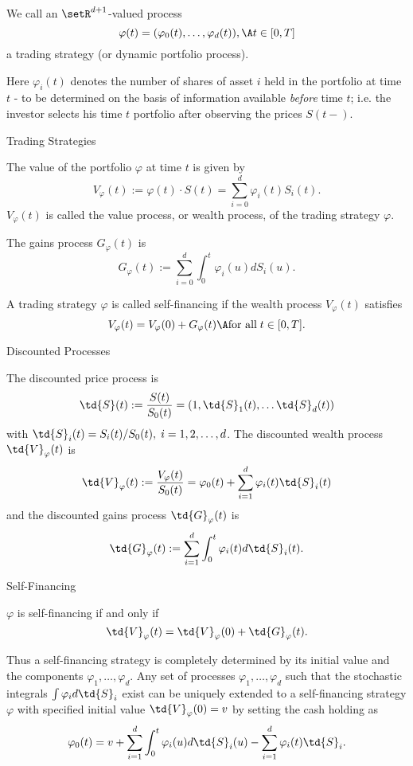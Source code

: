


	We call an $\setR^{d+1}$-valued process
$$
\varphi(t) = (\varphi_0(t), \ldots, \varphi_d(t)), \A t \in [0,T]
$$
a trading strategy (or dynamic portfolio process).

Here $\varphi_i(t)$ denotes the number of shares of asset $i$ held
in the portfolio at time $t$ - to be determined on the basis of
information available {\it before} time $t$; i.e. the investor
selects his time $t$ portfolio after observing the prices $S(t-)$.






{ Trading Strategies}






	The value of the portfolio $\varphi$ at time $t$ is
given by
$$
V_\varphi(t) :=  \varphi(t) \cdot S(t) = \sum_{i=0}^d \varphi_i(t)
S_i(t).
$$
$V_\varphi(t)$ is called the value process, or wealth process, of
the trading strategy $\varphi$.\

	 The gains process
$G_\varphi(t)$ is
$$
G_\varphi(t) := \sum_{i=0}^d \int_0^t \varphi_i(u) dS_i(u).
$$

	A trading strategy $\varphi$ is called self-financing if
the wealth process $V_\varphi(t)$ satisfies
$$
V_\varphi(t) = V_\varphi(0) + G_\varphi(t)\A \mbox{for all}\; t\in
[0,T].
$$






{ Discounted Processes}

The discounted price process is
$$
\td{S}(t) := \frac{S(t)}{S_0(t)} = (1, \td{S}_1(t), \ldots
\td{S}_d(t))
$$
with $\td{S}_i(t) = S_i(t)/S_0(t),\; i=1,2, \ldots, d$. The
discounted wealth process $\td{V}_\varphi(t)$ is
$$
\td{V}_\varphi(t):= \frac{V_\varphi(t)}{S_0(t)} = \varphi_0(t) +
\sum_{i=1}^d \varphi_i(t) \td{S}_i(t)
$$
and the discounted gains process $\td{G}_\varphi(t)$ is
$$
\td{G}_\varphi(t) := \sum_{i=1}^d \int_0^t \varphi_i(t)
d\td{S}_i(t).
$$

{ Self-Financing}

$\varphi$ is self-financing if and only if
$$
\td{V}_\varphi(t) = \td{V}_\varphi(0) + \td{G}_\varphi(t).
$$

Thus a self-financing strategy is completely determined by its
initial value and the components $\varphi_1, \ldots, \varphi_d$.
Any set of processes $\varphi_1, \ldots, \varphi_d$
such that the stochastic integrals $\int \varphi_i d\td{S}_i$
exist can be uniquely extended to a self-financing strategy
$\varphi$ with specified initial value $\td{V}_\varphi(0)= v$ by
setting the cash holding as
$$
\varphi_0(t) = v + \sum_{i=1}^d \int_0^t \varphi_i(u) d\td{S}_i(u)
- \sum_{i=1}^d \varphi_i(t) \td{S}_i.
$$

